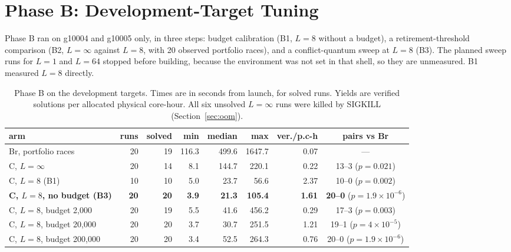 \documentclass[11pt,a4paper]{article}
\begin{document}
\section{Phase B: Development-Target Tuning}\label{sec:phaseB}

Phase B ran on g10004 and g10005 only, in three steps: budget calibration (B1, $L=8$ without a
budget), a retirement-threshold comparison (B2, $L=\infty$ against $L=8$, with 20 observed portfolio
races), and a conflict-quantum sweep at $L=8$ (B3). The planned sweep runs for $L=1$ and $L=64$
stopped before building, because the environment was not set in that shell, so they are unmeasured.
B1 measured $L=8$ directly.

\begin{table}[h]\centering\footnotesize\setlength{\tabcolsep}{4pt}
\begin{tabular}{@{}lrrrrrrc@{}}
\toprule
\textbf{arm} & \textbf{runs} & \textbf{solved} & \textbf{min} & \textbf{median} & \textbf{max} & \textbf{ver./p.c-h} & \textbf{pairs vs Br}\\
\midrule
Br, portfolio races & 20 & 19 & 116.3 & 499.6 & 1647.7 & 0.07 & ---\\
C, $L=\infty$ & 20 & 14 & 8.1 & 144.7 & 220.1 & 0.22 & 13--3 ($p=0.021$)\\
C, $L=8$ (B1) & 10 & 10 & 5.0 & 23.7 & 56.6 & 2.37 & 10--0 ($p=0.002$)\\
\textbf{C, $L=8$, no budget (B3)} & \textbf{20} & \textbf{20} & \textbf{3.9} & \textbf{21.3} & \textbf{105.4} & \textbf{1.61} & \textbf{20--0} ($p=1.9{\times}10^{-6}$)\\
C, $L=8$, budget 2{,}000 & 20 & 19 & 5.5 & 41.6 & 456.2 & 0.29 & 17--3 ($p=0.003$)\\
C, $L=8$, budget 20{,}000 & 20 & 20 & 3.7 & 30.7 & 251.5 & 1.21 & 19--1 ($p=4{\times}10^{-5}$)\\
C, $L=8$, budget 200{,}000 & 20 & 20 & 3.4 & 52.5 & 264.3 & 0.76 & 20--0 ($p=1.9{\times}10^{-6}$)\\
\bottomrule
\end{tabular}
\caption{Phase B on the development targets. Times are in seconds from launch, for solved runs.
Yields are verified solutions per allocated physical core-hour.
All six unsolved $L=\infty$ runs were killed by SIGKILL (Section~\ref{sec:oom}).}
\label{tab:phaseB}
\end{table}
\end{document}
